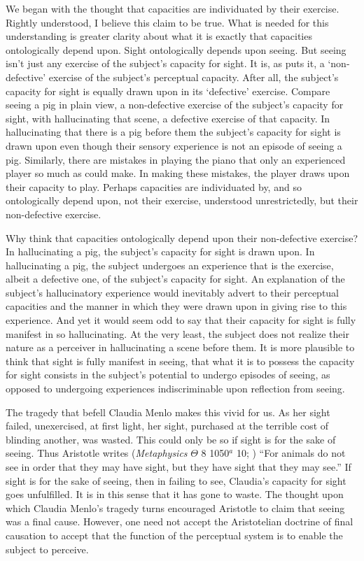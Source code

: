 \documentclass[12pt]{article}
\begin{document}
We began with the thought that capacities are individuated by their exercise. Rightly understood, I believe this claim to be true. What is needed for this understanding is greater clarity about what it is exactly that capacities ontologically depend upon. Sight ontologically depends upon seeing. But seeing isn't just any exercise of the subject's capacity for sight. It is, as \citet{McDowell:2010fk} puts it, a `non-defective' exercise of the subject's perceptual capacity. After all, the subject's capacity for sight is equally drawn upon in its `defective' exercise. Compare seeing a pig in plain view, a non-defective exercise of the subject's capacity for sight, with hallucinating that scene, a defective exercise of that capacity. In hallucinating that there is a pig before them the subject's capacity for sight is drawn upon even though their sensory experience is not an episode of seeing a pig. Similarly, there are mistakes in playing the piano that only an experienced player so much as could make. In making these mistakes, the player draws upon their capacity to play. Perhaps capacities are individuated by, and so ontologically depend upon, not their exercise, understood unrestrictedly, but their non-defective exercise.

Why think that capacities ontologically depend upon their non-defective exercise? In hallucinating a pig, the subject's capacity for sight is drawn upon. In hallucinating a pig, the subject undergoes an experience that is the exercise, albeit a defective one, of the subject's capacity for sight. An explanation of the subject's hallucinatory experience would inevitably advert to their perceptual capacities and the manner in which they were drawn upon in giving rise to this experience. And yet it would seem odd to say that their capacity for sight is fully manifest in so hallucinating. At the very least, the subject does not realize their nature as a perceiver in hallucinating a scene before them. It is more plausible to think that sight is fully manifest in seeing, that what it is to possess the capacity for sight consists in the subject's potential to undergo episodes of seeing, as opposed to undergoing experiences indiscriminable upon reflection from seeing.

The tragedy that befell Claudia Menlo makes this vivid for us. As her sight failed, unexercised, at first light, her sight, purchased at the terrible cost of blinding another, was wasted. This could only be so if sight is for the sake of seeing. Thus Aristotle writes (\emph{Metaphysics} \( \Theta \) 8 1050\( ^{a} \) 10; \citealt{Barnes:1984kx}) ``For animals do not see in order that they may have sight, but they have sight that they may see.'' If sight is for the sake of seeing, then in failing to see, Claudia's capacity for sight goes unfulfilled. It is in this sense that it has gone to waste. The thought upon which Claudia Menlo's tragedy turns encouraged Aristotle to claim that seeing was a final cause. However, one need not accept the Aristotelian doctrine of final causation to accept that the function of the perceptual system is to enable the subject to perceive. 
\end{document}
